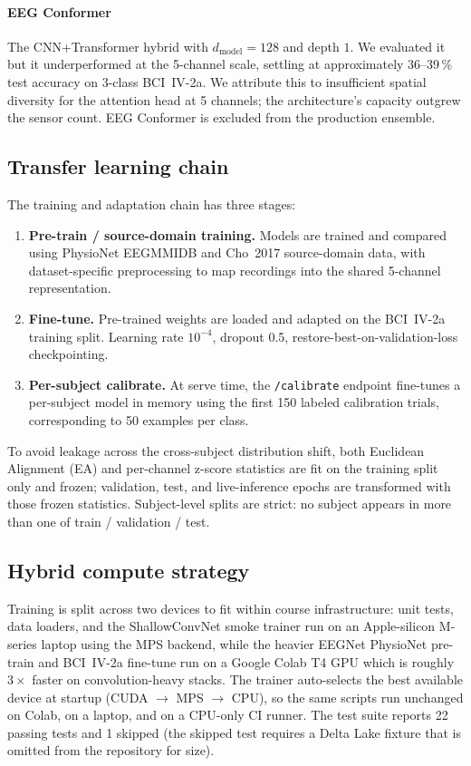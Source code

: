 \documentclass[conference]{IEEEtran}
\begin{document}
\paragraph{EEG Conformer~\cite{ref:song2022}} The CNN+Transformer hybrid with
$d_\text{model}=128$ and depth $1$. We evaluated it but it underperformed at
the 5-channel scale, settling at approximately 36--39\,\% test accuracy on
3-class BCI~IV-2a. We attribute this to insufficient spatial diversity for
the attention head at 5 channels; the architecture's capacity outgrew the
sensor count. EEG Conformer is excluded from the production ensemble.

\subsection{Transfer learning chain}

The training and adaptation chain has three stages:
\begin{enumerate}
\item \textbf{Pre-train / source-domain training.} Models are trained and
      compared using PhysioNet EEGMMIDB and Cho~2017 source-domain data,
      with dataset-specific preprocessing to map recordings into the shared
      5-channel representation.
\item \textbf{Fine-tune.} Pre-trained weights are loaded and adapted on the
      BCI~IV-2a training split. Learning rate $10^{-4}$, dropout 0.5,
      restore-best-on-validation-loss checkpointing.
\item \textbf{Per-subject calibrate.} At serve time, the
      \texttt{/calibrate} endpoint fine-tunes a per-subject model in memory
      using the first 150 labeled calibration trials, corresponding to
      50 examples per class.
\end{enumerate}

To avoid leakage across the cross-subject distribution shift, both
Euclidean Alignment (EA) and per-channel z-score statistics are fit on the
training split only and frozen; validation, test, and live-inference epochs
are transformed with those frozen statistics. Subject-level splits are
strict: no subject appears in more than one of train / validation / test.

\subsection{Hybrid compute strategy}

Training is split across two devices to fit within course infrastructure:
unit tests, data loaders, and the ShallowConvNet smoke trainer run on an
Apple-silicon M-series laptop using the MPS backend, while the heavier
EEGNet PhysioNet pre-train and BCI~IV-2a fine-tune run on a Google Colab
T4 GPU which is roughly $3\times$ faster on convolution-heavy stacks. The
trainer auto-selects the best available device at startup
(CUDA $\rightarrow$ MPS $\rightarrow$ CPU), so the same scripts run
unchanged on Colab, on a laptop, and on a CPU-only CI runner. The test
suite reports 22 passing tests and 1 skipped (the skipped test requires
a Delta Lake fixture that is omitted from the repository for size).
\end{document}
